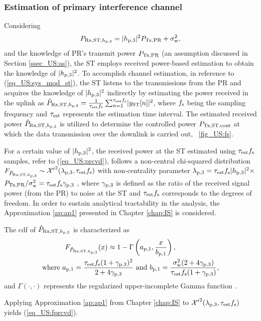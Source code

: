 \subsubsection{Estimation of primary interference channel} 
Considering
\begin{equation}
P_{\text{Rx,ST,$h_{\text{p,3}}$}} = |h_{\text{p,3}}|^2 P_{\text{Tx,PR}} + \sigma^2_{\text{w}} \label{eq_US:prcvd}, 
\end{equation}
and the knowledge of PR's transmit power $P_{\text{Tx,PR}}$ (an assumption discussed in Section  \ref{ssec_US:as}), the ST employs received power-based estimation to obtain the knowledge of $|h_{\text{p,3}}|^2$. To accomplish channel estimation, in reference to (\ref{eq_US:sys_mod_st}), the ST listens to the transmissions from the PR and acquires the knowledge of $|h_{\text{p,3}}|^2$ indirectly by estimating the power received in the uplink as $\hat{P}_{\text{Rx,ST,$h_{\text{p,3}}$}} = {\frac{1}{{\tau_{\text{est}} f_{\text{s}}}}\sum_{n=1}^{\tau_{\text{est}} f_{\text{s}}}} {|y_{\text{ST}}[n]|^2}$, where $f_{\text{s}}$ being the sampling frequency and $\tau_{\text{est}}$ represents the estimation time interval. 
The estimated received power $\hat{P}_{\text{Rx,ST,$h_{\text{p,3}}$}}$ is utilized to determine the controlled power $P_{\text{Tx,ST,cont}}$ at which the data transmission over the downlink is carried out, \figurename~\ref{fig_US:fs}. 


For a certain value of $|h_{\text{p,3}}|^2$, the received power at the ST estimated using $\tau_{\text{est}} f_{\text{s}}$ samples, refer to (\ref{eq_US:prcvd}), follows a non-central chi-squared distribution $\fprcvdstpr \sim \ncchi2(\lpth, \test \fsam)$ with non-centrality parameter $\lambda_{\text{p,3}} = \tau_{\text{est}} f_{\text{s}} |h_{\text{p,3}}|^2 \times$ $P_{\text{Tx,PR}} /\sigma^2_{\text{w}} = \tau_{\text{est}} f_{\text{s}} {\gamma}_{\text{p,3}}$ \cite{Kay}, where ${\gamma}_{\text{p,3}}$ is defined as the ratio of the received signal power (from the PR) to noise at the ST and $\tau_{\text{est}} f_{\text{s}}$ corresponds to the degrees of freedom. In order to sustain analytical tractability in the analysis, the Approximation \ref{ap:ap1} presented in Chapter \ref{chap:IS} is considered. 
\begin{lemma} \label{lm_US:lm1}
\normalfont
The cdf of $\hat{P}_{\text{Rx,ST,$h_{\text{p,3}}$}}$ is characterized as 
\begin{align}
F_{\hat{P}_{\text{Rx,ST,$h_{\text{p,3}}$}}}(x) \approx 1 - \Gamma&\left(a_{\text{p,1}}, \frac{x}{b_{\text{p,1}}}\right) \label{eq_US:fprcvd}, \\ 
\text{where  } a_{\text{p,1}} = \frac{\tau_{\text{est}} f_{\text{s}} (1 + {\gamma}_{\text{p,3}})^2}{2 + 4 {\gamma}_{\text{p,3}}} &\text{ and } b_{\text{p,1}} = \frac{\sigma^2_{\text{w}} (2 + 4 {\gamma}_{\text{p,3}})}{\tau_{\text{est}} f_{\text{s}} (1 + {\gamma}_{\text{p,3}})},  \label{eq_US:para_po} 
\end{align} 
and $\Gamma(\cdot, \cdot)$ represents the regularized upper-incomplete Gamma function \cite{abramo}. 
\end{lemma}
\begin{IEEEproof}[Solution]
Applying Approximation \ref{ap:ap1} from Chapter \ref{chap:IS} to $\ncchi2(\lpth, \test \fsam)$ yields (\ref{eq_US:fprcvd}). 
\end{IEEEproof}

